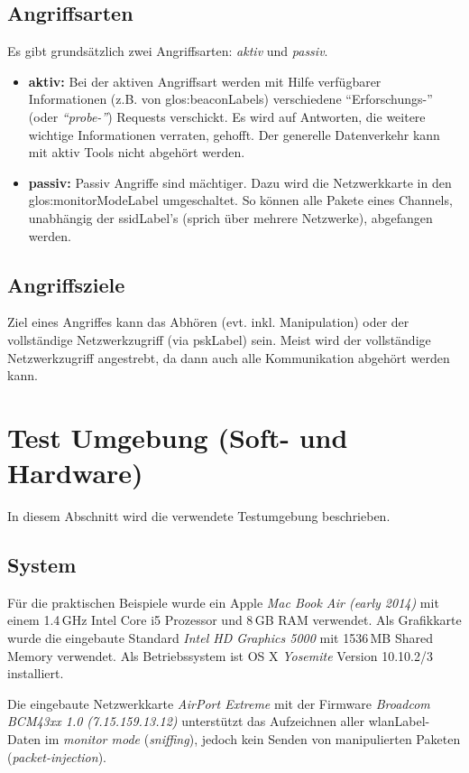 \subsection{Angriffsarten}
Es gibt grundsätzlich zwei Angriffsarten: \textit{aktiv} und \textit{passiv}.
\begin{itemize}
	\item \textbf{aktiv:}
	Bei der aktiven Angriffsart werden mit Hilfe verfügbarer Informationen (z.B. von \glspl{glos:beaconLabel}) verschiedene "`Erforschungs-"' (oder \textit{"`probe-"'}) Requests verschickt.
	Es wird auf Antworten, die weitere wichtige Informationen verraten, gehofft.
	Der generelle Datenverkehr kann mit aktiv Tools nicht abgehört werden.

	\item \textbf{passiv:}
	Passiv Angriffe sind mächtiger. Dazu wird die Netzwerkkarte in den \gls{glos:monitorModeLabel} umgeschaltet.
	So können alle Pakete eines Channels, unabhängig der \gls{ssidLabel}'s (sprich über mehrere Netzwerke), abgefangen werden.

\end{itemize}

\subsection{Angriffsziele}
Ziel eines Angriffes kann das Abhören (evt. inkl. Manipulation) oder der vollständige Netzwerkzugriff (via \gls{pskLabel}) sein.
Meist wird der vollständige Netzwerkzugriff angestrebt, da dann auch alle Kommunikation abgehört werden kann.

\section{Test Umgebung (Soft- und Hardware)}
\label{sec:testEnvroiment}
In diesem Abschnitt wird die verwendete Testumgebung beschrieben.

\subsection{System}
Für die praktischen Beispiele wurde ein Apple \textit{Mac Book Air (early 2014)} mit einem 1.4\,GHz Intel Core i5 Prozessor und 8\,GB RAM verwendet. Als Grafikkarte wurde die eingebaute Standard \textit{Intel HD Graphics 5000} mit 1536\,MB Shared Memory verwendet.
Als Betriebssystem ist OS X \textit{Yosemite} Version 10.10.2/3  installiert.

Die eingebaute Netzwerkkarte \textit{AirPort Extreme} mit der Firmware \textit{Broadcom BCM43xx 1.0 (7.15.159.13.12)} unterstützt das Aufzeichnen aller \gls{wlanLabel}-Daten im \textit{monitor mode} (\textit{sniffing}), jedoch kein Senden von manipulierten Paketen (\textit{packet-injection}).

